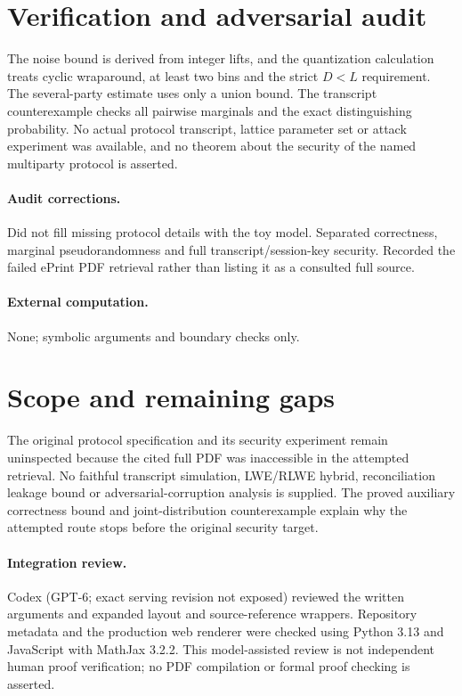 \documentclass[11pt]{article}
\begin{document}
\section{Verification and adversarial audit}
The noise bound is derived from integer lifts, and the quantization calculation treats cyclic wraparound, at least two bins and the strict $D<L$ requirement. The several-party estimate uses only a union bound. The transcript counterexample checks all pairwise marginals and the exact distinguishing probability. No actual protocol transcript, lattice parameter set or attack experiment was available, and no theorem about the security of the named multiparty protocol is asserted.
\paragraph{Audit corrections.} Did not fill missing protocol details with the toy model. Separated correctness, marginal pseudorandomness and full transcript/session-key security. Recorded the failed ePrint PDF retrieval rather than listing it as a consulted full source.
\paragraph{External computation.} None; symbolic arguments and boundary checks only.
\section{Scope and remaining gaps}
The original protocol specification and its security experiment remain uninspected because the cited full PDF was inaccessible in the attempted retrieval. No faithful transcript simulation, LWE/RLWE hybrid, reconciliation leakage bound or adversarial-corruption analysis is supplied. The proved auxiliary correctness bound and joint-distribution counterexample explain why the attempted route stops before the original security target.
\paragraph{Integration review.} Codex (GPT-6; exact serving revision not exposed) reviewed the written arguments and expanded layout and source-reference wrappers. Repository metadata and the production web renderer were checked using Python 3.13 and JavaScript with MathJax 3.2.2. This model-assisted review is not independent human proof verification; no PDF compilation or formal proof checking is asserted.
\end{document}
